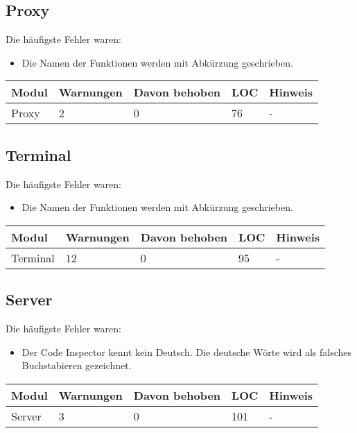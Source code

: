 \documentclass[qualitaetssicherung.tex]{subfiles}
\begin{document}
\subsection{Proxy}
			Die häufigste Fehler waren:
			\begin{itemize}
				\item Die Namen der Funktionen werden mit Abkürzung geschrieben.
			\end{itemize}
			\begin{center}
					\begin{tabular}{| l | l | l | l | l |}
					\hline
					Modul & Warnungen & Davon behoben & LOC & Hinweis\\ \hline
					Proxy & 2 & 0 & 76 & - \\ \hline
					\hline
					\end{tabular}
			\end{center}
			
\subsection{Terminal}
			Die häufigste Fehler waren:
			\begin{itemize}
				\item Die Namen der Funktionen werden mit Abkürzung geschrieben.
			\end{itemize}
			\begin{center}
					\begin{tabular}{| l | l | l | l | l |}
					\hline
					Modul & Warnungen & Davon behoben & LOC & Hinweis\\ \hline
					Terminal & 12 & 0 & 95 & - \\ \hline
					\hline
					\end{tabular}
			\end{center}

\subsection{Server}
			Die häufigste Fehler waren:
			\begin{itemize}
				\item Der Code Inspector kennt kein Deutsch. Die deutsche Wörte wird als
				falsches Buchstabieren gezeichnet.
			\end{itemize}
			\begin{center}
					\begin{tabular}{| l | l | l | l | l |}
					\hline
					Modul & Warnungen & Davon behoben & LOC & Hinweis\\ \hline
					Server & 3 & 0 & 101 & - \\ \hline
					\hline
					\end{tabular}
			\end{center}
			
\end{document}
